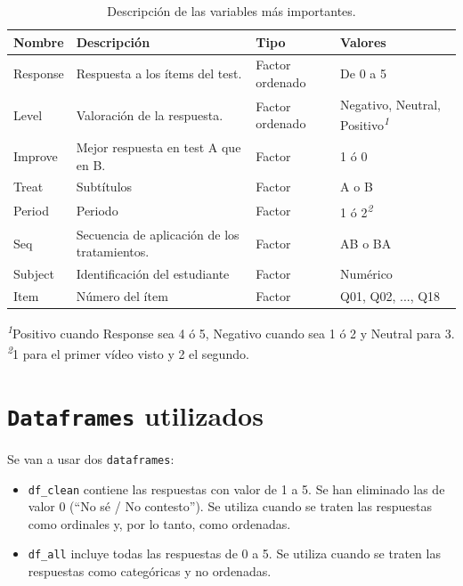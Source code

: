 \documentclass[
  12pt,
  a4paper,
  extrafontsizes,
  onecolumn,
  openright,
  table]{memoir}
\providecommand{\tightlist}{%
  \setlength{\itemsep}{0pt}\setlength{\parskip}{0pt}}\usepackage{longtable,booktabs,array}
\begin{document}
\footnotesize

\hypertarget{tbl-variables}{}
\setlength{\LTpost}{0mm}
\begin{longtable}{llll}
\caption{\label{tbl-variables}Descripción de las variables más importantes. }\tabularnewline

\toprule
Nombre & Descripción & Tipo & Valores \\ 
\midrule
Response & Respuesta a los ítems del test. & Factor ordenado & De 0 a 5 \\ 
Level & Valoración de la respuesta. & Factor ordenado & Negativo, Neutral, Positivo\textsuperscript{\textit{1}} \\ 
Improve & Mejor respuesta en test A que en B. & Factor & 1 ó 0 \\ 
Treat & Subtítulos & Factor & A o B \\ 
Period & Periodo & Factor & 1 ó 2\textsuperscript{\textit{2}} \\ 
Seq & Secuencia de aplicación de los tratamientos. & Factor & AB o BA \\ 
Subject & Identificación del estudiante & Factor & Numérico \\ 
Item & Número del ítem & Factor & Q01, Q02, ..., Q18 \\ 
\bottomrule
\end{longtable}
\begin{minipage}{\linewidth}
\textsuperscript{\textit{1}}Positivo cuando Response sea 4 ó 5, Negativo cuando sea 1 ó 2 y Neutral para 3.\\
\textsuperscript{\textit{2}}1 para el primer vídeo visto y 2 el segundo.\\
\end{minipage}

\normalsize

\hypertarget{dataframes-utilizados}{%
\section{\texorpdfstring{\texttt{Dataframes}
utilizados}{Dataframes utilizados}}\label{dataframes-utilizados}}

Se van a usar dos \texttt{dataframes}:

\begin{itemize}
\tightlist
\item
  \texttt{df\_clean} contiene las respuestas con valor de 1 a 5. Se han
  eliminado las de valor 0 (\enquote{No sé / No contesto}). Se utiliza
  cuando se traten las respuestas como ordinales y, por lo tanto, como
  ordenadas.
\item
  \texttt{df\_all} incluye todas las respuestas de 0 a 5. Se utiliza
  cuando se traten las respuestas como categóricas y no ordenadas.
\end{itemize}
\end{document}
